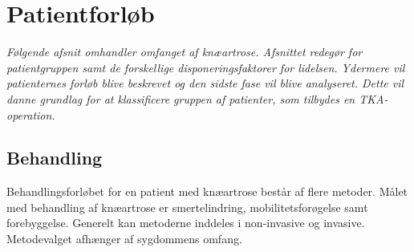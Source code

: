 \section{Patientforløb} \label{patientforlob}
\textit{Følgende afsnit omhandler omfanget af knæartrose. Afsnittet redegør for patientgruppen samt de forskellige disponeringsfaktorer for lidelsen. Ydermere vil patienternes forløb blive beskrevet og den sidste fase vil blive analyseret. Dette vil danne grundlag for at klassificere gruppen af patienter, som tilbydes en TKA-operation.}

\subsection{Behandling}
Behandlingsforløbet for en patient med knæartrose består af flere metoder. Målet med behandling af knæartrose er smertelindring, mobilitetsforøgelse samt forebyggelse. Generelt kan metoderne inddeles i non-invasive og invasive. Metodevalget afhænger af sygdommens omfang. \citep{Lind2016b}

